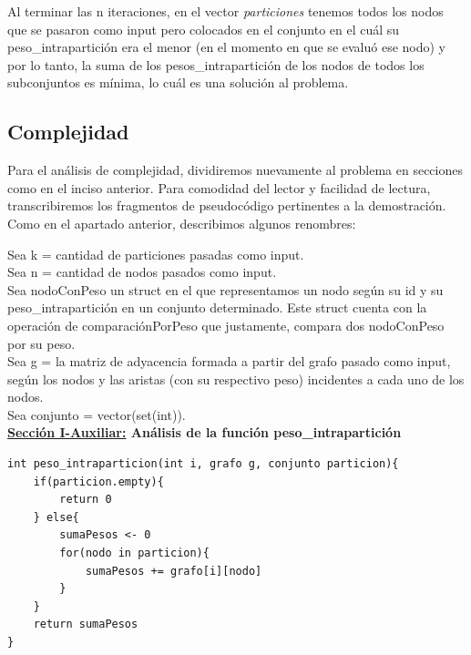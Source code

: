 \documentclass[10pt,a4paper]{article}
\begin{document}
Al terminar las n iteraciones, en el vector \textit{particiones} tenemos todos los nodos que se pasaron como input pero colocados en el conjunto en el cuál su peso\_intrapartición era el menor (en el momento en que se evaluó ese nodo) y por lo tanto, la suma de los pesos\_intrapartición de los nodos de todos los subconjuntos es mínima, lo cuál es una solución al problema.


\newpage
\subsection{Complejidad}

Para el análisis de complejidad, dividiremos nuevamente al problema en secciones como en el inciso anterior. Para comodidad del lector y facilidad de lectura, transcribiremos los fragmentos de pseudocódigo pertinentes a la demostración.
Como en el apartado anterior, describimos algunos renombres:


Sea k = cantidad de particiones pasadas como input.\\
Sea n = cantidad de nodos pasados como input.\\
Sea nodoConPeso un struct en el que representamos un nodo según su id y su peso\_intrapartición en un conjunto determinado. Este struct cuenta con la operación de comparaciónPorPeso que justamente, compara dos nodoConPeso por su peso.\\
Sea g = la matriz de adyacencia formada a partir del grafo pasado como input, según los nodos y las aristas (con su respectivo peso) incidentes a cada uno de los nodos.\\
Sea conjunto = vector(set(int)).\\


\textbf{\underline{Sección I-Auxiliar:} Análisis de la función peso\_intrapartición}

\begin{lstlisting}
int peso_intraparticion(int i, grafo g, conjunto particion){
	if(particion.empty){
		return 0
	} else{
		sumaPesos <- 0
		for(nodo in particion){
			sumaPesos += grafo[i][nodo]
		}
	}
	return sumaPesos
}
\end{lstlisting}
\end{document}
